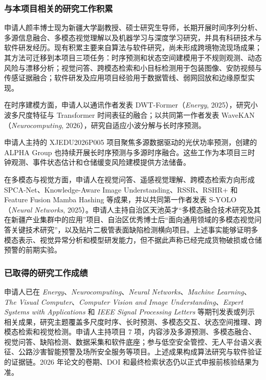 \justifying
\NSFCBodyText

\subsubsection{与本项目相关的研究工作积累}

申请人颜丰博士现为新疆大学副教授、硕士研究生导师，长期开展时间序列分析、多源信息融合、多模态视觉理解以及机器学习与深度学习研究，并具有科研技术与软件研发经历。现有积累主要来自算法与软件研究，尚未形成跨境物流现场成果；其方法可迁移到本项目三项任务：时序预测和状态空间建模用于不规则观测、动态风险与漂移分析；视觉问答、跨模态检索和小目标检测用于包装图像、安防视频与传感证据融合；软件研发及应用项目经验用于数据管线、弱网回放和边缘原型实现。

在时序建模方面，申请人以通讯作者发表 DWT-Former（\emph{Energy}, 2025），研究小波多尺度特征与 Transformer 时间表征的融合；以共同第一作者发表 WaveKAN（\emph{Neurocomputing}, 2026），研究自适应小波分解与长时序预测。

申请人主持的 XJEDU2026P005 项目聚焦多源数据驱动的光伏功率预测，创建的 ALPHA Group 也持续开展长时序预测与多源时序融合。这些工作为本项目三时钟观测、事件状态估计和仓储缓变风险建模提供方法储备。

在多模态与视觉方面，申请人在视觉问答、遥感视觉理解、跨模态检索方向形成 SPCA-Net、Knowledge-Aware Image Understanding、RSSR、RSHR+ 和 Feature Fusion Mamba Hashing 等成果，并以共同第一作者发表 S-YOLO（\emph{Neural Networks}, 2025）。申请人主持自治区天池英才“多模态融合技术研究及其在新疆产业集群中的应用”项目、自治区优秀博士后“面向通用领域的多模态视觉问答关键技术研究”，以及贴片二极管表面缺陷检测横向项目。上述事实能够证明多模态表示、视觉异常分析和模型研发能力，但不据此声称已经完成货物破损或仓储预警的前期实验。

\subsubsection{已取得的研究工作成绩}

申请人已在 \emph{Energy}、\emph{Neurocomputing}、\emph{Neural Networks}、\emph{Machine Learning}、\emph{The Visual Computer}、\emph{Computer Vision and Image Understanding}、\emph{Expert Systems with Applications} 和 \emph{IEEE Signal Processing Letters} 等期刊发表或列示相关成果，研究主题覆盖多尺度时序、长时预测、多模态交互、状态空间推理、跨模态检索和视觉检测。申请人主持项目 7 项，内容涉及多源预测、多模态融合、视觉问答、缺陷检测、数据采集和软件底座；参与低空安全管控、无人平台语义表征、公路沙害智能预警及场所安全服务等项目。上述成果构成算法研究与软件验证的证据链。2026 年论文的卷期、DOI 和最终检索状态仍以正式申报前核验结果为准。

